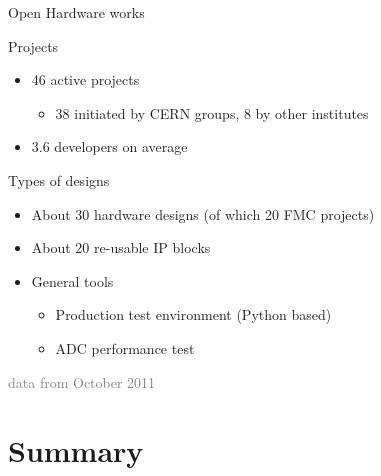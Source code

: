 \documentclass[compress,red]{beamer}
\begin{document}
\begin{frame}{Open Hardware works}
	\begin{block}{Projects}
   \begin{itemize}
	\item 46 active projects
	\begin{itemize}
		\item 38 initiated by CERN groups, 8 by other institutes
	   \end{itemize}
	\item 3.6 developers on average 
   \end{itemize}
	\end{block}

\begin{block}{Types of designs}
\begin{itemize}
	\item About 30 hardware designs (of which 20 FMC projects)
	\item About 20 re-usable IP blocks
	\item General tools
	\begin{itemize}
		\item Production test environment (Python based)
		\item ADC performance test
	\end{itemize}
   \end{itemize}
	\end{block}
\textcolor{gray}{data from October 2011}
\end{frame}
\section{Summary}
\end{document}

